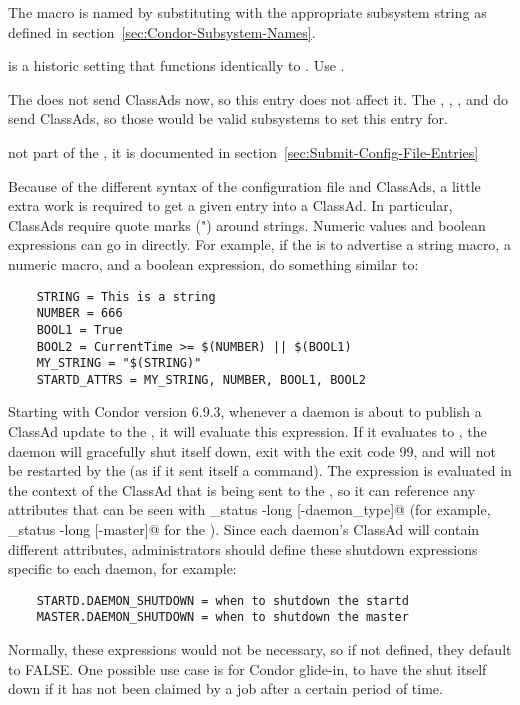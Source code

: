 \begin{description}
  The macro is named by substituting 
  with the appropriate subsystem string as defined in
  section~\ref{sec:Condor-Subsystem-Names}.

   is a historic setting that functions identically to
  . Use .

  \Note The  does not send
  ClassAds now, so this entry does not affect it.  The
  , , , and
   do send ClassAds, so those would be valid
  subsystems to set this entry for.
  
   not part of the , it is
  documented in section~\ref{sec:Submit-Config-File-Entries}

  Because of the different syntax of the configuration
  file and ClassAds, a little extra work is required to get a
  given entry into a ClassAd.  In particular, ClassAds require quote
  marks (") around strings.  Numeric values and boolean expressions
  can go in directly.  
  For example, if the  is to advertise a string macro, a numeric
  macro, and a boolean expression, do something similar to:

  \begin{verbatim}
    STRING = This is a string 
    NUMBER = 666
    BOOL1 = True
    BOOL2 = CurrentTime >= $(NUMBER) || $(BOOL1)
    MY_STRING = "$(STRING)"
    STARTD_ATTRS = MY_STRING, NUMBER, BOOL1, BOOL2
  \end{verbatim}

\label{param:DaemonShutdown}
\item[\Macro{DAEMON\_SHUTDOWN}]
  Starting with Condor version 6.9.3, whenever a daemon is about to
  publish a ClassAd update to the , it will evaluate
  this expression.
  If it evaluates to , the daemon will gracefully shut itself down,
  exit with the exit code 99,
  and will not be restarted by the  (as if it sent
  itself a  command).
  The expression is evaluated in the context of the ClassAd that is
  being sent to the , so it can reference any
  attributes that can be seen with
  \verb@condor_status -long [-daemon_type]@ (for example,
  \verb@condor_status -long [-master]@ for the ).
  Since each daemon's ClassAd will contain different attributes,
  administrators should define these shutdown expressions specific to
  each daemon, for example:
  \begin{verbatim}
    STARTD.DAEMON_SHUTDOWN = when to shutdown the startd
    MASTER.DAEMON_SHUTDOWN = when to shutdown the master
  \end{verbatim}
  Normally, these expressions would not be necessary, so if not
  defined, they default to FALSE.
  One possible use case is for Condor glide-in, to have the
   shut itself down if it has not been claimed by a job
  after a certain period of time.


\end{description}
